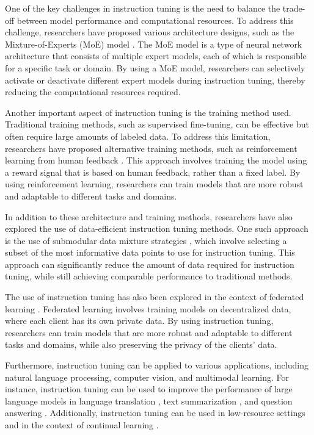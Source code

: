 \documentclass[11pt]{article}
\begin{document}
One of the key challenges in instruction tuning is the need to balance the trade-off between model performance and computational resources. To address this challenge, researchers have proposed various architecture designs, such as the Mixture-of-Experts (MoE) model \cite{ref25}. The MoE model is a type of neural network architecture that consists of multiple expert models, each of which is responsible for a specific task or domain. By using a MoE model, researchers can selectively activate or deactivate different expert models during instruction tuning, thereby reducing the computational resources required.

Another important aspect of instruction tuning is the training method used. Traditional training methods, such as supervised fine-tuning, can be effective but often require large amounts of labeled data. To address this limitation, researchers have proposed alternative training methods, such as reinforcement learning from human feedback \cite{ref24}. This approach involves training the model using a reward signal that is based on human feedback, rather than a fixed label. By using reinforcement learning, researchers can train models that are more robust and adaptable to different tasks and domains.

In addition to these architecture and training methods, researchers have also explored the use of data-efficient instruction tuning methods. One such approach is the use of submodular data mixture strategies \cite{ref35}, which involve selecting a subset of the most informative data points to use for instruction tuning. This approach can significantly reduce the amount of data required for instruction tuning, while still achieving comparable performance to traditional methods.

The use of instruction tuning has also been explored in the context of federated learning \cite{ref36}. Federated learning involves training models on decentralized data, where each client has its own private data. By using instruction tuning, researchers can train models that are more robust and adaptable to different tasks and domains, while also preserving the privacy of the clients' data.

Furthermore, instruction tuning can be applied to various applications, including natural language processing, computer vision, and multimodal learning. For instance, instruction tuning can be used to improve the performance of large language models in language translation \cite{ref2}, text summarization \cite{ref37}, and question answering \cite{ref38}. Additionally, instruction tuning can be used in low-resource settings \cite{ref39} and in the context of continual learning \cite{ref40}.
\end{document}
